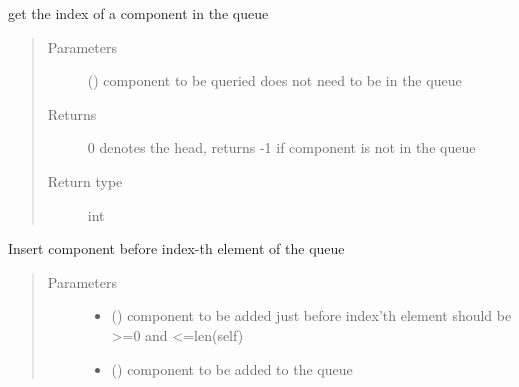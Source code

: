 \documentclass[letterpaper,10pt,english]{sphinxmanual}
\begin{document}
\begin{fulllineitems}
\begin{fulllineitems}
\end{fulllineitems}


\begin{fulllineitems}
\label{\detokenize{Reference:salabim.Queue.index}}
get the index of a component in the queue
\begin{quote}\begin{description}
\item[{Parameters}] \leavevmode
{} ({\hyperref[\detokenize{Reference:salabim.Component}]{}}) \textendash{} component to be queried 
does not need to be in the queue

\item[{Returns}] \leavevmode
{} \textendash{} 0 denotes the head, 
returns -1 if component is not in the queue

\item[{Return type}] \leavevmode
int

\end{description}\end{quote}

\end{fulllineitems}


\begin{fulllineitems}
\label{\detokenize{Reference:salabim.Queue.insert}}
Insert component before index-th element of the queue
\begin{quote}\begin{description}
\item[{Parameters}] \leavevmode\begin{itemize}
\item {} 
 () \textendash{} component to be added just before index’th element 
should be \textgreater{}=0 and \textless{}=len(self)

\item {} 
 ({\hyperref[\detokenize{Reference:salabim.Component}]{}}) \textendash{} component to be added to the queue


\end{itemize}
\end{description}
\end{quote}
\end{fulllineitems}
\end{fulllineitems}
\end{document}
